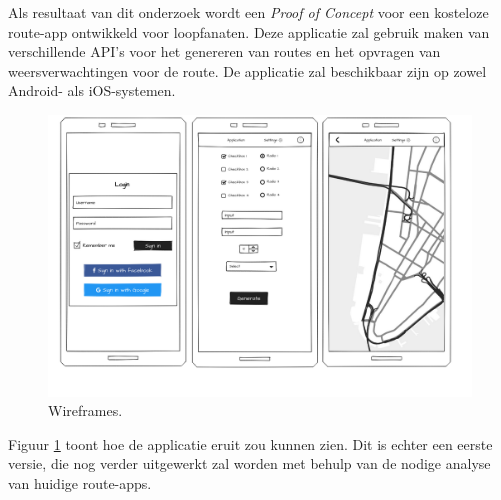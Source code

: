 Als resultaat van dit onderzoek wordt een \emph{Proof of Concept}
voor een kosteloze route-app ontwikkeld voor loopfanaten.
Deze applicatie zal gebruik maken van verschillende API's voor het
genereren van routes en het opvragen van weersverwachtingen voor de route.
De applicatie zal beschikbaar zijn op zowel Android- als iOS-systemen.


\begin{figure}[h!]
    \includegraphics[width=\linewidth]{./graphics/wireframes.png}
    \caption{Wireframes.}
    \label{fig:wireframes}
\end{figure}

Figuur \ref{fig:wireframes} toont hoe de applicatie eruit zou kunnen zien. Dit is echter een eerste versie,
die nog verder uitgewerkt zal worden met behulp van de nodige analyse van huidige route-apps.
